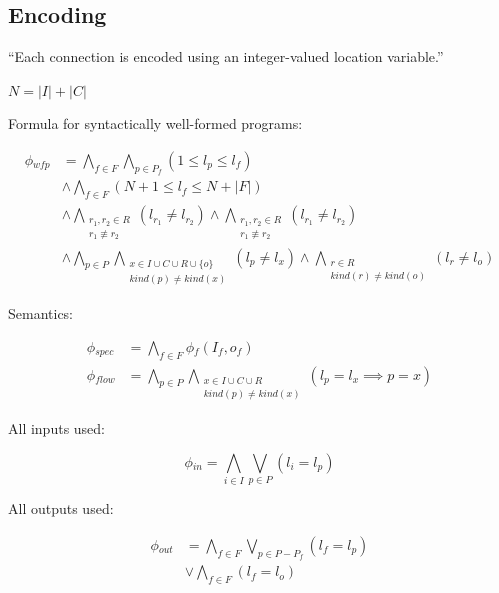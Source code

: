
\subsection{Encoding}
\label{sec:encoding}


``Each connection is encoded using an integer-valued location variable.''

\(N = |I| + |C|\)

Formula for syntactically well-formed programs:

\begin{align*}
  \phi{}_{wfp} &= \bigwedge_{f \in F}\bigwedge_{p \in P_f} (1 \leq l_p \leq l_f) \\
  &\wedge \bigwedge_{f \in F} (N + 1 \leq l_f \leq N + |F|) \\
  &\wedge \bigwedge_{\substack{r_1, r_2 \in R\\ r_1 \not\equiv r_2}} (l_{r_1} \neq l_{r_2})
   \wedge \bigwedge_{\substack{r_1, r_2 \in R\\ r_1 \not\equiv r_2}} (l_{r_1} \neq l_{r_2}) \\
  &\wedge \bigwedge_{p \in P}\bigwedge_{\substack{x \in I \cup C \cup R \cup \{o\} \\ kind(p) \neq kind(x)}} (l_p \neq l_x)
   \wedge \bigwedge_{\substack{r \in R \\ kind(r) \neq kind(o)}} (l_r \neq l_o)
\end{align*}

Semantics:

\begin{align*}
  \phi{}_{spec} &= \bigwedge_{f \in F} \phi{}_f (I_f, o_f) \\
  \phi{}_{flow} &= \bigwedge_{p \in P}\bigwedge_{\substack{x \in I \cup C \cup R \\ kind(p) \neq kind(x)}} (l_p = l_x \implies p = x)
\end{align*}

All inputs used:

\[ \phi{}_{in} = \bigwedge_{i \in I}\bigvee_{p \in P}(l_i = l_p) \]

All outputs used:

\begin{align*}
  \phi{}_{out} &= \bigwedge_{f \in F}\bigvee_{p \in P - P_f}(l_f = l_p) \\
               &\vee \bigwedge_{f \in F} (l_f = l_o)
\end{align*}

